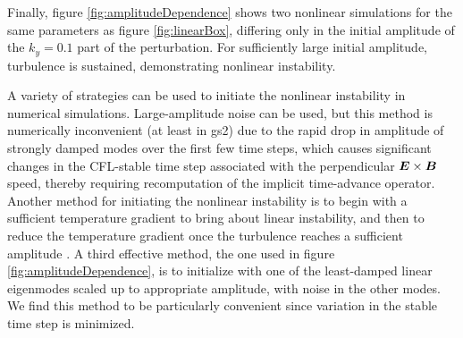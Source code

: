 \documentclass[12pt,superscriptaddress]{revtex4}
\newcommand{\vect}[1]{\mbox{\boldmath $#1$}}
\begin{document}
Finally, figure \ref{fig:amplitudeDependence} shows two nonlinear simulations for the same parameters as figure \ref{fig:linearBox},
differing only in the initial amplitude of the $k_y=0.1$ part of the perturbation.
For sufficiently large initial amplitude, turbulence is sustained,
demonstrating nonlinear instability.

A variety of strategies can be used to initiate the nonlinear instability in numerical simulations.
Large-amplitude noise can be used, but this method is numerically inconvenient (at least in gs2) due to the rapid
drop in amplitude of strongly damped modes over the first few time steps,
which causes significant changes in the CFL-stable time step associated
with the perpendicular $\vect{E}\times\vect{B}$ speed,
thereby requiring recomputation of the implicit time-advance operator.
Another method for initiating the nonlinear instability is to begin with a sufficient
temperature gradient to bring about linear instability, and then to reduce the temperature gradient
once the turbulence reaches a sufficient amplitude \cite{Drake}.
A third effective method, the one used in figure \ref{fig:amplitudeDependence},
is to initialize with one of the least-damped linear eigenmodes scaled up to appropriate amplitude, with noise in the other modes.  We find this method to be particularly convenient since variation in the stable time step
is minimized.
\end{document}
